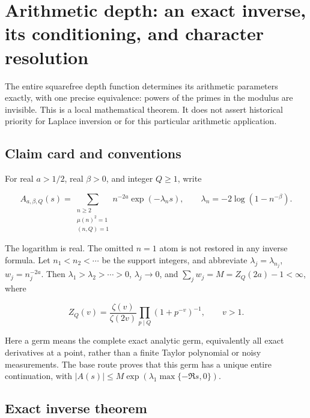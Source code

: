 \hypertarget{arithmetic-depth-an-exact-inverse-its-conditioning-and-character-resolution}{%
\section{Arithmetic depth: an exact inverse, its conditioning, and
character
resolution}\label{arithmetic-depth-an-exact-inverse-its-conditioning-and-character-resolution}}



The entire squarefree depth function determines its arithmetic
parameters exactly, with one precise equivalence: powers of the primes
in the modulus are invisible. This is a local mathematical theorem. It
does not assert historical priority for Laplace inversion or for this
particular arithmetic application.

\hypertarget{claim-card-and-conventions}{%
\subsection{Claim card and
conventions}\label{claim-card-and-conventions}}

For real \(a>1/2\), real \(\beta>0\), and integer \(Q\ge1\), write

\[
 A_{a,\beta,Q}(s)=\sum_{\substack{n\ge2\\ \mu(n)^2=1\\ (n,Q)=1}}
 n^{-2a}\exp(-\lambda_n s),\qquad
 \lambda_n=-2\log(1-n^{-\beta}).
\]

The logarithm is real. The omitted \(n=1\) atom is not restored in any
inverse formula. Let \(n_1<n_2<\cdots\) be the support integers, and
abbreviate \(\lambda_j=\lambda_{n_j}\), \(w_j=n_j^{-2a}\). Then
\(\lambda_1>\lambda_2>\cdots>0\), \(\lambda_j\to0\), and
\(\sum_jw_j=M=Z_Q(2a)-1<\infty\), where

\[
 Z_Q(v)=\frac{\zeta(v)}{\zeta(2v)}
          \prod_{p\mid Q}(1+p^{-v})^{-1},\qquad v>1.
\]

Here a germ means the complete exact analytic germ, equivalently all
exact derivatives at a point, rather than a finite Taylor polynomial or
noisy measurements. The base route proves that this germ has a unique
entire continuation, with
\(|A(s)|\le M\exp(\lambda_1\max\{-\Re s,0\})\).

\hypertarget{exact-inverse-theorem}{%
\subsection{Exact inverse theorem}\label{exact-inverse-theorem}}


